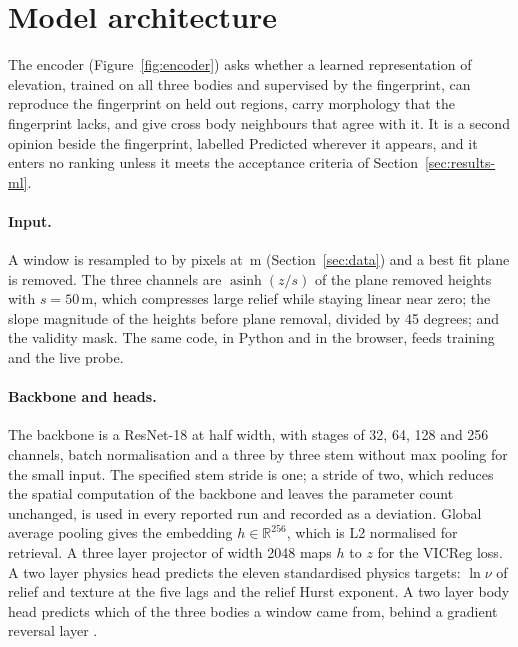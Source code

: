 \section{Model architecture}
\label{sec:architecture}



The encoder (Figure~\ref{fig:encoder}) asks whether a learned representation of elevation,
trained on all three bodies and supervised by the fingerprint, can reproduce the fingerprint on
held out regions, carry morphology that the fingerprint lacks, and give cross body neighbours that
agree with it. It is a second opinion beside the fingerprint, labelled Predicted wherever it
appears, and it enters no ranking unless it meets the acceptance criteria of Section~\ref{sec:results-ml}.

\paragraph{Input.} A window is resampled to \ConfigInputPx{} by \ConfigInputPx{} pixels at
\ConfigInputSpacing\,m (Section~\ref{sec:data}) and a best fit plane is removed. The three channels
are $\operatorname{asinh}(z / s)$ of the plane removed heights with $s = 50$\,m, which compresses large relief while staying linear near zero; the slope magnitude of the heights before plane removal, divided by 45 degrees; and the validity mask. The same code,
in Python and in the browser, feeds training and the live probe.

\paragraph{Backbone and heads.} The backbone is a ResNet-18 \citep{he2015} at half width, with
stages of 32, 64, 128 and 256 channels, batch normalisation \citep{ioffe2015} and a three by three stem without max pooling for the small input. The specified stem stride is one; a stride of two, which reduces the spatial computation of the backbone and leaves the parameter count unchanged, is used in every reported run and recorded as a deviation. Global average pooling gives the embedding $h \in \mathbb{R}^{256}$, which is
L2 normalised for retrieval. A three layer projector of width 2048 maps $h$ to $z$ for the VICReg
loss. A two layer physics head predicts the eleven standardised physics targets: $\ln \nu$ of
relief and texture at the five lags and the relief Hurst exponent. A two layer body head predicts
which of the three bodies a window came from, behind a gradient reversal layer \citep{ganin2015}.

